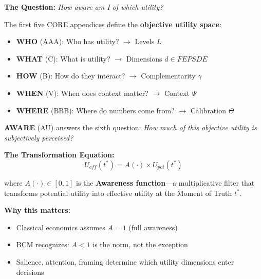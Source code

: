 \begin{tcolorbox}[colback=orange!5!white, colframe=orange!75!black,
    title=\textbf{CORE-AWARE: The Sixth Fundamental Question}]

\textbf{The Question:} \textit{How aware am I of which utility?}

\vspace{0.5em}
The first five CORE appendices define the \textbf{objective utility space}:
\begin{itemize}[nosep]
    \item \textbf{WHO} (AAA): Who has utility? $\rightarrow$ Levels $L$
    \item \textbf{WHAT} (C): What is utility? $\rightarrow$ Dimensions $d \in FEPSDE$
    \item \textbf{HOW} (B): How do they interact? $\rightarrow$ Complementarity $\gamma$
    \item \textbf{WHEN} (V): When does context matter? $\rightarrow$ Context $\Psi$
    \item \textbf{WHERE} (BBB): Where do numbers come from? $\rightarrow$ Calibration $\Theta$
\end{itemize}

\vspace{0.5em}
\textbf{AWARE} (AU) answers the sixth question: \textit{How much of this objective utility is subjectively perceived?}

\vspace{0.5em}
\textbf{The Transformation Equation:}
\[
\boxed{U_{eff}(t^*) = A(\cdot) \times U_{pot}(t^*)}
\]

where $A(\cdot) \in [0,1]$ is the \textbf{Awareness function}---a multiplicative filter that transforms potential utility into effective utility at the Moment of Truth $t^*$.

\vspace{0.5em}
\textbf{Why this matters:}
\begin{itemize}[nosep]
    \item Classical economics assumes $A = 1$ (full awareness)
    \item BCM recognizes: $A < 1$ is the norm, not the exception
    \item Salience, attention, framing determine which utility dimensions enter decisions
\end{itemize}

\end{tcolorbox}

\vspace{1em}

